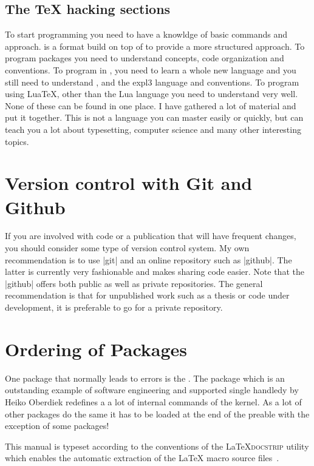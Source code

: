 \subsection{The TeX hacking sections}

To start programming \tex you need to have a knowldge of \tex basic commands and approach.  is a format build on top of \tex to provide a more structured approach. To program \latexe packages you need to understand \latexe concepts, code organization and conventions. To program in , you need to learn a whole new language and you still need to understand \tex, \latexe and the expl3 language and conventions. To program using LuaTeX, other than the Lua language you need to understand \tex very well.
None of these can be found in one place.  I have gathered a lot of material and put it together. This is not a language you can master easily or quickly, but can teach you a lot about typesetting, computer science and many other interesting topics.


 \section{Version control with Git and Github}
 
 If you are involved with code or a publication that will have frequent changes, you should consider
 some type of version control system. My own recommendation is to use |git| and an online repository such
 as |github|. The latter is currently very fashionable and makes sharing code easier. Note that the |github|
 offers both public as well as private repositories. The general recommendation is that for unpublished work
 such as a thesis or code under development, it is preferable to go for a private repository. 
 

 \section{Ordering of Packages}
 
One package that normally leads to errors is the 
. The package which is an outstanding example of software engineering and supported single handledy by Heiko Oberdiek \citeyearpar{hyperref} redefines a a lot of internal commands of the kernel. As a lot of other packages do the same it has to be loaded at the end of the preable with the exception of some packages! 
 
 This manual is typeset according to the conventions of the
 \LaTeX \textsc{docstrip} utility which enables the automatic
 extraction of the \LaTeX{} macro source files~\cite{GOOSSENS94}.

